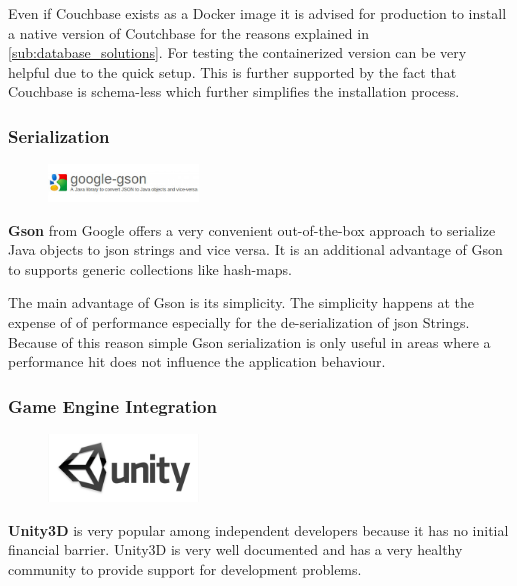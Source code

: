 Even if Couchbase exists as a Docker image it is advised for production to
install a native version of Coutchbase for the reasons explained in
\autoref{sub:database_solutions}. For testing the containerized version can be
very helpful due to the quick setup. This is further supported by the fact that
Couchbase is schema-less which further simplifies the installation process. 
    
\newpage
\subsubsection{Serialization}

\begin{figure}
    \includegraphics[width=4cm]{images/dependencies/google-gson}
\end{figure}

\textbf{Gson} from Google offers a very convenient out-of-the-box approach to
serialize Java objects to \gls{json} strings and vice versa. It is an additional
advantage of Gson to supports generic collections like hash-maps.

The main advantage of Gson is its simplicity. The simplicity happens at the
expense of of performance especially for the de-serialization of \gls{json}
Strings. Because of this reason simple Gson serialization is only useful in
areas where a performance hit does not influence the application behaviour.

\subsubsection{Game Engine Integration}

\begin{figure}
    \includegraphics[width=4cm]{images/dependencies/Unity3D}
\end{figure}
    
\textbf{Unity3D} is very popular among independent developers because it has no
initial financial barrier. Unity3D is very well documented and has a very
healthy community to provide support for development problems.

